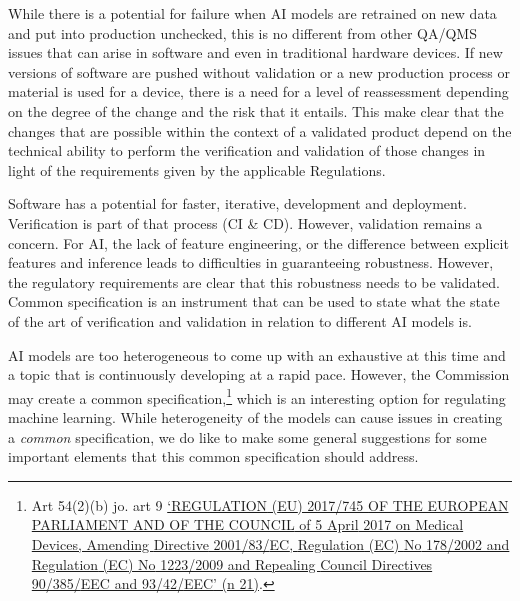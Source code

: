 \documentclass[
]{scrartcl}
\begin{document}
While there is a potential for failure when AI models are retrained on new data and put into production unchecked, this is no different from other QA/QMS issues that can arise in software and even in traditional hardware devices. If new versions of software are pushed without validation or a new production process or material is used for a device, there is a need for a level of reassessment depending on the degree of the change and the risk that it entails. This make clear that the changes that are possible within the context of a validated product depend on the technical ability to perform the verification and validation of those changes in light of the requirements given by the applicable Regulations.

Software has a potential for faster, iterative, development and deployment. Verification is part of that process (CI \& CD). However, validation remains a concern. For AI, the lack of feature engineering, or the difference between explicit features and inference leads to difficulties in guaranteeing robustness. However, the regulatory requirements are clear that this robustness needs to be validated. Common specification is an instrument that can be used to state what the state of the art of verification and validation in relation to different AI models is.

AI models are too heterogeneous to come up with an exhaustive at this time and a topic that is continuously developing at a rapid pace. However, the Commission may create a common specification,\footnote{Art 54(2)(b) jo. art 9 \protect\hyperlink{ref-REGULATIONEU2017a}{{`{REGULATION} ({EU}) 2017/745 {OF THE EUROPEAN PARLIAMENT AND OF THE COUNCIL} of 5 {April} 2017 on Medical Devices, Amending {Directive} 2001/83/{EC}, {Regulation} ({EC}) {No} 178/2002 and {Regulation} ({EC}) {No} 1223/2009 and Repealing {Council Directives} 90/385/{EEC} and 93/42/{EEC}'} (n 21)}.} which is an interesting option for regulating machine learning. While heterogeneity of the models can cause issues in creating a \emph{common} specification, we do like to make some general suggestions for some important elements that this common specification should address.
\end{document}
